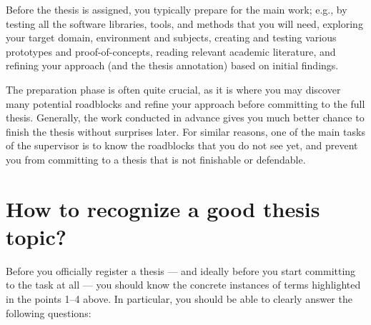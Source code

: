 Before the thesis is assigned, you typically prepare for the main work; e.g., by testing all the software libraries, tools, and methods that you will need, exploring your target domain, environment and subjects, creating and testing various prototypes and proof-of-concepts, reading relevant academic literature, and refining your approach (and the thesis annotation) based on initial findings.

The preparation phase is often quite crucial, as it is where you may discover many potential roadblocks and refine your approach before committing to the full thesis. Generally, the work conducted in advance gives you much better chance to finish the thesis without surprises later. For similar reasons, one of the main tasks of the supervisor is to know the roadblocks that you do not see yet, and prevent you from committing to a thesis that is not finishable or defendable.

\section{How to recognize a good thesis topic?}

Before you officially register a thesis --- and ideally before you start committing to the task at all --- you should know the concrete instances of terms highlighted in the points 1--4 above. In particular, you should be able to clearly answer the following questions:

